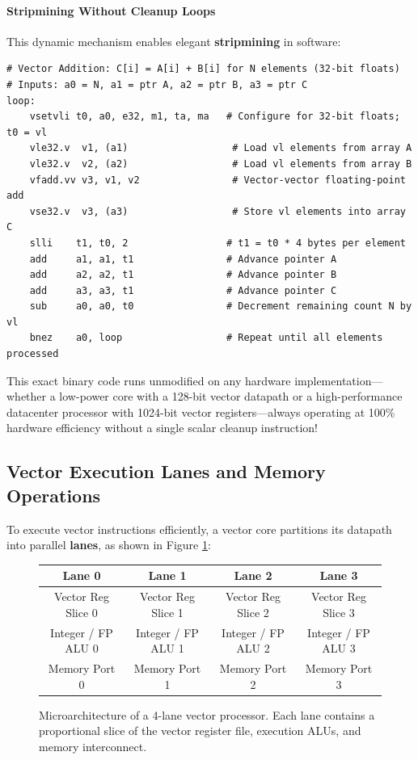 \paragraph{Stripmining Without Cleanup Loops}
This dynamic mechanism enables elegant \textbf{stripmining} in software:
\begin{verbatim}
# Vector Addition: C[i] = A[i] + B[i] for N elements (32-bit floats)
# Inputs: a0 = N, a1 = ptr A, a2 = ptr B, a3 = ptr C
loop:
    vsetvli t0, a0, e32, m1, ta, ma   # Configure for 32-bit floats; t0 = vl
    vle32.v  v1, (a1)                  # Load vl elements from array A
    vle32.v  v2, (a2)                  # Load vl elements from array B
    vfadd.vv v3, v1, v2                # Vector-vector floating-point add
    vse32.v  v3, (a3)                  # Store vl elements into array C
    slli    t1, t0, 2                 # t1 = t0 * 4 bytes per element
    add     a1, a1, t1                # Advance pointer A
    add     a2, a2, t1                # Advance pointer B
    add     a3, a3, t1                # Advance pointer C
    sub     a0, a0, t0                # Decrement remaining count N by vl
    bnez    a0, loop                  # Repeat until all elements processed
\end{verbatim}
This exact binary code runs unmodified on any hardware implementation—whether a low-power core with a 128-bit vector datapath or a high-performance datacenter processor with 1024-bit vector registers—always operating at 100\% hardware efficiency without a single scalar cleanup instruction!

\subsection{Vector Execution Lanes and Memory Operations}
To execute vector instructions efficiently, a vector core partitions its datapath into parallel \textbf{lanes}, as shown in Figure \ref{fig:vector_lanes}:
\begin{figure}[htbp]
  \begin{center}
    \small
    \begin{tabular}{|c|c|c|c|}
      \hline
      \textbf{Lane 0} & \textbf{Lane 1} & \textbf{Lane 2} & \textbf{Lane 3} \\ \hline
      Vector Reg Slice 0 & Vector Reg Slice 1 & Vector Reg Slice 2 & Vector Reg Slice 3 \\ \hline
      Integer / FP ALU 0 & Integer / FP ALU 1 & Integer / FP ALU 2 & Integer / FP ALU 3 \\ \hline
      Memory Port 0 & Memory Port 1 & Memory Port 2 & Memory Port 3 \\ \hline
    \end{tabular}
    \caption{Microarchitecture of a 4-lane vector processor. Each lane contains a proportional slice of the vector register file, execution ALUs, and memory interconnect.}
    \label{fig:vector_lanes}
  \end{center}
\end{figure}

